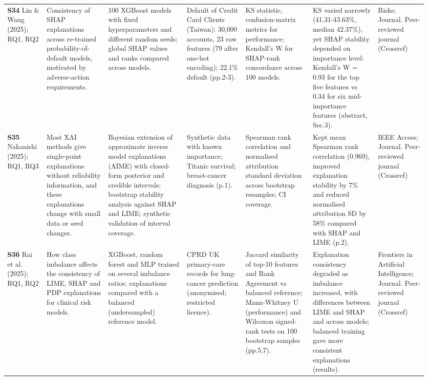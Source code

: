 \begin{longtable}{@{}P{1.55cm}P{2.9cm}P{4.5cm}P{3.2cm}P{3.4cm}P{4.6cm}P{3.6cm}@{}}
\textbf{S34} \cite{S34} Lin \& Wang (2025); RQ1, RQ2 & Consistency of SHAP explanations across re-trained probability-of-default models, motivated by adverse-action requirements. & 100 XGBoost models with fixed hyperparameters and different random seeds; global SHAP values and ranks compared across models. & Default of Credit Card Clients (Taiwan): 30,000 accounts, 23 raw features (79 after one-hot encoding); 22.1\% default (pp.2-3). & KS statistic, confusion-matrix metrics for performance; Kendall's W for SHAP-rank concordance across 100 models. & KS varied narrowly (41.31-43.63\%, median 42.37\%), yet SHAP stability depended on importance level: Kendall's W = 0.93 for the top five features vs 0.34 for six mid-importance features (abstract, Sec.3). & Risks; Journal. Peer-reviewed journal (Crossref) \\
\textbf{S35} \cite{S35} Nakanishi (2025); RQ1, RQ3 & Most XAI methods give single-point explanations without reliability information, and these explanations change with small data or seed changes. & Bayesian extension of approximate inverse model explanations (AIME) with closed-form posterior and credible intervals; bootstrap stability analysis against SHAP and LIME; synthetic validation of interval coverage. & Synthetic data with known importance; Titanic survival; breast-cancer diagnosis (p.1). & Spearman rank correlation and normalised attribution standard deviation across bootstrap resamples; CI coverage. & Kept mean Spearman rank correlation (0.969), improved explanation stability by 7\% and reduced normalised attribution SD by 58\% compared with SHAP and LIME (p.2). & IEEE Access; Journal. Peer-reviewed journal (Crossref) \\
\textbf{S36} \cite{S36} Rai et al. (2025); RQ1, RQ2 & How class imbalance affects the consistency of LIME, SHAP and PDP explanations for clinical risk models. & XGBoost, random forest and MLP trained on several imbalance ratios; explanations compared with a balanced (undersampled) reference model. & CPRD UK primary-care records for lung-cancer prediction (anonymised; restricted licence). & Jaccard similarity of top-10 features and Rank Agreement vs balanced reference; Mann-Whitney U (performance) and Wilcoxon signed-rank tests on 100 bootstrap samples (pp.5,7). & Explanation consistency degraded as imbalance increased, with differences between LIME and SHAP and across models; balanced training gave more consistent explanations (results). & Frontiers in Artificial Intelligence; Journal. Peer-reviewed journal (Crossref) \\

\end{longtable}
